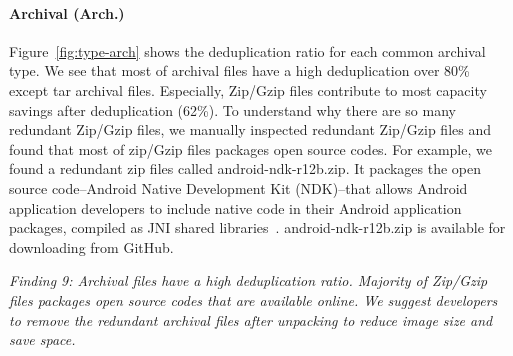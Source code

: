 
\paragraph{Archival (Arch.)}

Figure~\ref{fig:type-arch} shows the deduplication ratio for each common archival type.
We see that most of archival files have a high deduplication over 80\% except tar archival files. Especially,
Zip/Gzip files contribute to most capacity savings after deduplication (62\%).
To understand why there are so many redundant Zip/Gzip files, we manually inspected redundant Zip/Gzip files and found that
most of zip/Gzip files packages open source codes.
For example, we found a redundant zip files called android-ndk-r12b.zip. It packages the open source code--Android Native Development Kit (NDK)--that allows Android application developers to include native code in their Android application packages, compiled as JNI shared libraries~\cite{xxx}. android-ndk-r12b.zip is available for downloading from GitHub. 

\textit{Finding 9: Archival files have a high deduplication ratio. Majority of Zip/Gzip files packages open source codes that are available online. We suggest developers to remove the redundant archival files after unpacking to reduce image size and save space.}

%
%

